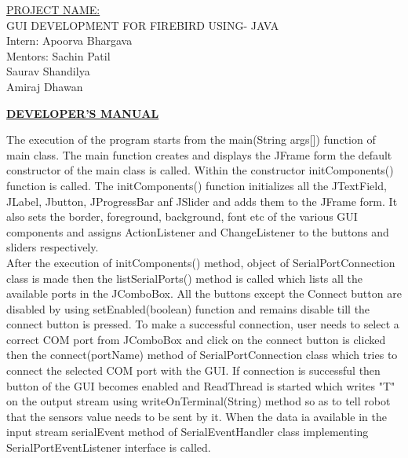 \documentclass{article}
\begin{document}
	\begin{center}
		\Huge \color{blue}\underline{PROJECT NAME:} \vspace{4cm} \\
		\huge \color{green} GUI DEVELOPMENT FOR FIREBIRD USING- JAVA \vspace{4cm} \\
		\color{black}\Large Intern: Apoorva Bhargava \vspace{3cm} \\
		\Large Mentors: Sachin Patil \\
		\Large \qquad \qquad \qquad \quad Saurav Shandilya \\
		\Large \qquad \qquad \qquad Amiraj Dhawan 
	\end{center}
		\newpage
	\begin{center}
		\Huge \color{red} \textbf{\underline{DEVELOPER'S MANUAL}}
	\end{center}
	\vspace{1cm}
	The execution of the program starts from the main(String args[]) function of main class. The main function creates and displays the JFrame form the default constructor of the main class is called. Within the constructor initComponents() function is called. The initComponents() function initializes all the JTextField, JLabel, Jbutton, JProgressBar anf JSlider and adds them to the JFrame form. It also sets the border, foreground, background, font etc of the various GUI components and assigns ActionListener and ChangeListener to the buttons and sliders respectively. \newline \\ 
    After the execution of initComponents() method, object of SerialPortConnection class is made then the listSerialPorts() method is called which lists all the available ports in the JComboBox. All the buttons except the Connect button are disabled by using setEnabled(boolean) function and remains disable till the connect button is pressed. To make a successful connection, user needs to select a correct COM port from JComboBox and click on the connect button is clicked then the connect(portName) method of SerialPortConnection class which tries to connect the selected COM port with the GUI. If connection is successful then button of the GUI becomes enabled and ReadThread is started which writes "T" on the output stream using writeOnTerminal(String) method so as to tell robot that the sensors value needs to be sent by it. When the data ia available in the input stream serialEvent method of SerialEventHandler class implementing SerialPortEventListener interface is called. \newline \\ 
\end{document}
